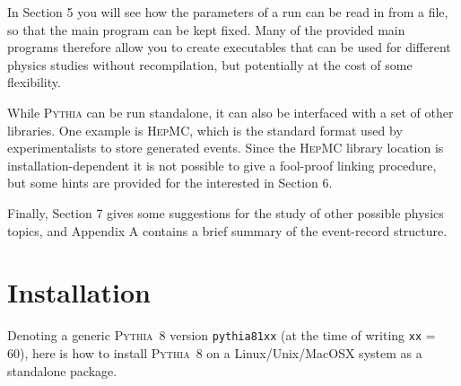 \documentclass[12pt,a4paper]{article}
\begin{document}
In Section 5 you will see how the parameters of a run can be read in 
from a file, so that the main program can be kept fixed. Many of the 
provided main programs therefore allow you to create executables that 
can be used for different physics studies without recompilation,
but potentially at the cost of some flexibility.    

While \textsc{Pythia} can be run standalone, it can also be interfaced 
with a set of other libraries. One example is \textsc{HepMC}, which 
is the standard format used by experimentalists to store generated 
events. Since the \textsc{HepMC} library location is 
installation-dependent it is not possible to give a fool-proof linking 
procedure, but some hints are provided for the interested in Section 6.

Finally, Section 7 gives some suggestions for the study of other possible 
physics topics, and Appendix A contains a brief summary of the event-record 
structure.

\section{Installation}

Denoting a generic \textsc{Pythia}~8 version \texttt{pythia81xx}
(at the time of writing \texttt{xx} = 60), here is how to install 
\textsc{Pythia}~8 on a Linux/Unix/MacOSX system as a standalone package. 
\end{document}
